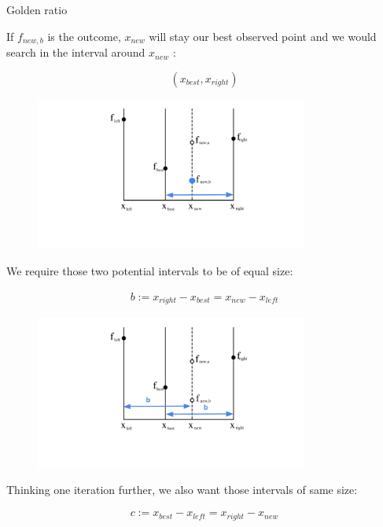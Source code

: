 \documentclass[11pt,compress,t,notes=noshow, xcolor=table]{beamer}
\begin{document}
\begin{vbframe}{Golden ratio}
\framebreak 

If $f_{new, b}$ is the outcome, $x_{new}$ will stay our best observed point and we would search in the interval around $x_{new}$ : 

$$
    (x_{best}, x_{right}) 
$$

\begin{figure}
\includegraphics[width=0.8\textwidth]{figure_man/goldensec-2.png}\\
\end{figure}

\framebreak 

We require those two potential intervals to be of equal size: 

\begin{eqnarray*}
    b := x_{right} - x_{best} = x_{new} - x_{left}
\end{eqnarray*}

\begin{figure}
\includegraphics[width=0.8\textwidth]{figure_man/goldensec-3.png}\\
\end{figure}

\framebreak 

Thinking one iteration further, we also want those intervals of same size: 

\begin{eqnarray*}
    c := x_{best} - x_{left} = x_{right} - x_{new}
\end{eqnarray*}


\end{vbframe}
\end{document}
